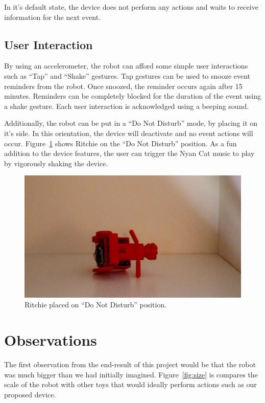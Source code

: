 \documentclass{sigchi-ext}
\begin{document}
In it's default state, the device does not perform any actions and waits to
receive information for the next event.

\subsection{User Interaction}

By using an accelerometer, the robot can afford some simple user interactions
such as ``Tap'' and ``Shake'' gestures. Tap gestures can be used to snooze event
reminders from the robot. Once snoozed, the reminder occurs again after 15
minutes. Reminders can be completely blocked for the duration of the event
using a shake gesture. Each user interaction is acknowledged using a beeping
sound.

Additionally, the robot can be put in a ``Do Not Disturb'' mode, by placing it
on it's side. In this orientation, the device will deactivate and no event
actions will occur. Figure~\ref{fig:dontdisturb} shows Ritchie on the ``Do Not
Disturb'' position. As a fun addition to the device features, the user can
trigger the Nyan Cat music to play by vigorously shaking the device.

\begin{figure}
  \includegraphics[width=0.9\columnwidth]{../photos/dontdisturb}
  \caption{Ritchie placed on ``Do Not Disturb'' position.}
  \label{fig:dontdisturb}
\end{figure}

\section{Observations}

The first observation from the end-result of this project would be that the
robot was much bigger than we had initially imagined. Figure~\ref{fig:size} is
compares the scale of the robot with other toys that would ideally
perform actions such as our proposed device.
\end{document}
